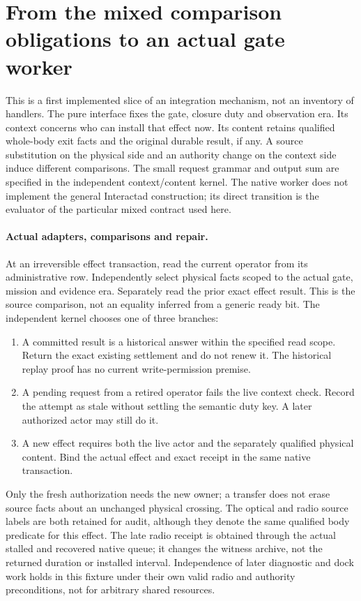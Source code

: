 \documentclass{article}
\begin{document}
\section*{From the mixed comparison obligations to an actual gate worker}
This is a first implemented slice of an integration mechanism, not
an inventory of handlers. The pure interface fixes the gate, closure
duty and observation era. Its context concerns who can install that
effect now. Its content retains qualified whole-body exit facts and
the original durable result, if any. A source substitution on the
physical side and an authority change on the context side induce
different comparisons. The small request grammar and output sum
are specified in the independent context/content kernel.
The native worker does not implement the general Interactad
construction; its direct transition is the evaluator of the
particular mixed contract used here.

\paragraph{Actual adapters, comparisons and repair.}
At an irreversible effect transaction, read the current operator
from its administrative row. Independently select physical facts
scoped to the actual gate, mission and evidence era. Separately
read the prior exact effect result. This is the source comparison,
not an equality inferred from a generic ready bit. The independent
kernel chooses one of three branches:
\begin{enumerate}
\item A committed result is a historical answer within the specified
read scope. Return the exact existing settlement and do not renew it.
The historical replay proof has no current write-permission premise.
\item A pending request from a retired operator fails the live
context check. Record the attempt as stale without settling
the semantic duty key. A later authorized actor may still do it.
\item A new effect requires both the live actor and the separately
qualified physical content. Bind the actual effect and exact
receipt in the same native transaction.
\end{enumerate}
Only the fresh authorization needs the new owner; a transfer
does not erase source facts about an unchanged physical crossing.
The optical and radio source labels are both retained for audit,
although they denote the same qualified body predicate for this
effect. The late radio receipt is obtained through the actual
stalled and recovered native queue; it changes the witness archive,
not the returned duration or installed interval. Independence of later
diagnostic and dock work holds in this fixture under their own valid
radio and authority preconditions, not for arbitrary shared resources.
\end{document}

